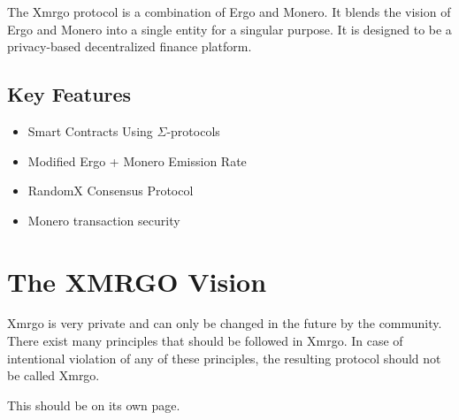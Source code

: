 \documentclass{article}
\begin{document}
\indent The Xmrgo protocol is a combination of Ergo and Monero. It blends the 
vision of Ergo and Monero into a single entity for a singular purpose. It is 
designed to be a privacy-based decentralized finance platform.

\subsection*{Key Features}
\begin{itemize}
    \item Smart Contracts Using $\Sigma$-protocols
    \item Modified Ergo + Monero Emission Rate
    \item RandomX Consensus Protocol
    \item Monero transaction security
\end{itemize}

\section*{The XMRGO Vision}

\indent Xmrgo is very private and can only be changed in the future by the 
community. There exist many principles that should be followed in Xmrgo. 
In case of intentional violation of any of these principles, the resulting protocol should not be called Xmrgo.

\clearpage

\noindent This should be on its own page.
\end{document}

